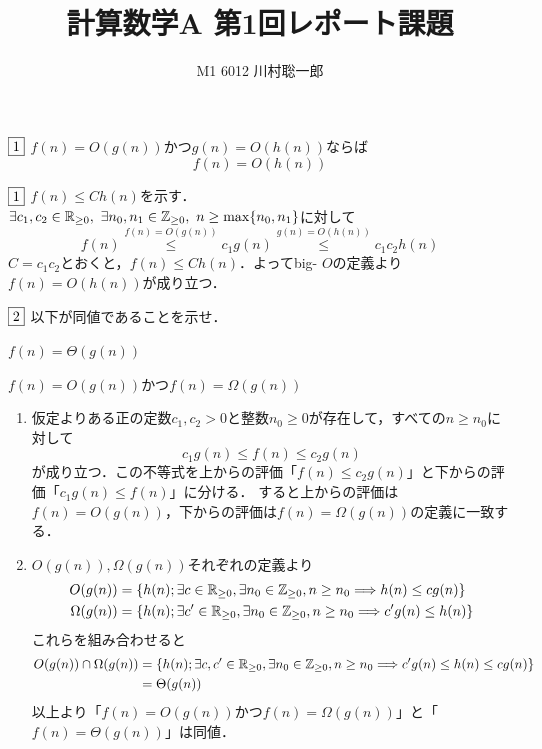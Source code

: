 \documentclass[dvipdfmx]{jsreport}
\title{計算数学A 第1回レポート課題}
\author{M1 6012 川村聡一郎}
\date{}
\begin{document}
\maketitle

\begin{tcolorbox}
	$\fbox{1}$ $f(n)= O(g(n))$かつ$g(n)= O(h(n))$ならば
\begin{equation*}
	f(n)= O(h(n))
\end{equation*}
\end{tcolorbox}

\begin{souanswer} %
	$\fbox{1}$ $f(n)\le Ch(n)$を示す．\\
	$\exists c_1, c_2\in \mathbb{R}_{\ge 0},\ \exists n_0, n_1\in \mathbb{Z}_{\ge 0},\ n\ge \max\{n_0, n_1\}$に対して
\begin{equation}
	f(n)\stackrel{f(n)= O(g(n))}{\le} c_1g(n)\stackrel{g(n)= O(h(n))}{\le} c_1c_2h(n)
\end{equation}
	$C= c_1c_2$とおくと，$f(n)\le Ch(n)$．よってbig- $O$の定義より$f(n)= O(h(n))$が成り立つ．
\end{souanswer}


\begin{tcolorbox}
	$\fbox{2}$ 以下が同値であることを示せ．
\begin{enumerate_alpha}
	\item $f(n)= \Theta(g(n))$
	\item $f(n)= O(g(n))$かつ$f(n)= \Omega(g(n))$
\end{enumerate_alpha}
\end{tcolorbox}

\begin{souanswer} %
\begin{enumerate}
	\item[$\Rightarrow$] 
	仮定よりある正の定数$c_1, c_2> 0$と整数$n_0\ge 0$が存在して，すべての$n\ge n_0$に対して
\begin{equation}
	c_1g(n)\le f(n)\le c_2g(n)
\end{equation}
	が成り立つ．この不等式を上からの評価「$f(n)\le c_2g(n)$」と下からの評価「$c_1g(n)\le f(n)$」に分ける．
	すると上からの評価は$f(n)= O(g(n))$，下からの評価は$f(n)= \Omega(g(n))$の定義に一致する．

	\item[$\Leftarrow$] 
	$O(g(n)), \Omega(g(n))$それぞれの定義より
\begin{align}
	O(g(n))&= \{h(n); \exists c\in \mathbb{R}_{\ge 0}, \exists n_0\in \mathbb{Z}_{\ge 0}, n\ge n_0\Longrightarrow h(n)\le cg(n)\}\\
	\Omega(g(n))&= \{h(n); \exists c'\in \mathbb{R}_{\ge 0}, \exists n_0\in \mathbb{Z}_{\ge 0}, n\ge n_0\Longrightarrow c'g(n)\le h(n)\}
\end{align}
	これらを組み合わせると
\begin{align}
	O(g(n))\cap \Omega(g(n))&= \{h(n); \exists c, c'\in \mathbb{R}_{\ge 0}, \exists n_0\in \mathbb{Z}_{\ge 0}, n\ge n_0\Longrightarrow c'g(n)\le h(n)\le cg(n)\}\\
	&= \Theta(g(n))
\end{align}
	以上より「$f(n)= O(g(n))$かつ$f(n)= \Omega(g(n))$」と「$f(n)= \Theta(g(n))$」は同値．
\end{enumerate}
\end{souanswer}
\end{document}
